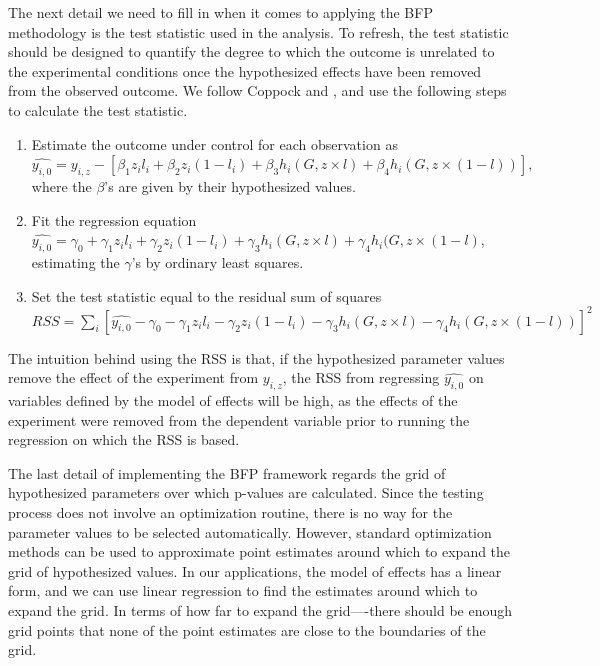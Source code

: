 \documentclass[12pt]{article}
\begin{document}
The next detail we need to fill in when it comes to applying the BFP methodology is the test statistic used in the analysis. To refresh, the test statistic should be designed to quantify the degree to which the outcome is unrelated to the experimental conditions once the hypothesized effects have been removed from the observed outcome. We follow Coppock and \citet{bowers2016research}, and use the following steps to calculate the test statistic.
\begin{enumerate}
\item Estimate the outcome under control for each observation as \\ $\hat{y_{i,0} } = y_{i,z} - \left[ \beta_1z_il_i+\beta_2z_i(1-l_i)+\beta_3h_i(G,z\times l)+\beta_4h_i(G,z\times (1-l)) \right],$ where the $\beta$'s are given by their hypothesized values.
\item Fit the regression equation  \\ $ \hat{y_{i,0} } = \gamma_0 + \gamma_1z_il_i+\gamma_2z_i(1-l_i)+\gamma_3h_i(G,z\times l)+\gamma_4h_i(G,z\times (1-l)$, estimating the $\gamma$'s by ordinary least squares. 
\item Set the test statistic equal to the residual sum of squares \\ $ RSS =  \sum_i \left[ \hat{y_{i,0} }-  \gamma_0 - \gamma_1z_il_i-\gamma_2z_i(1-l_i)-\gamma_3h_i(G,z\times l)-\gamma_4h_i(G,z\times (1-l) ) \right]^2$
\end{enumerate}
The intuition behind using the RSS is that, if the hypothesized parameter values remove the effect of the experiment from $y_{i,z}$, the RSS from regressing $\hat{y_{i,0} } $ on variables defined by the model of effects will be high, as the effects of the experiment were removed from the dependent variable prior to running the regression on which the RSS is based. 

The last detail of implementing the BFP framework regards the grid of hypothesized parameters over which p-values are calculated. Since the testing process does not involve an optimization routine, there is no way for the parameter values to be selected automatically. However, standard optimization methods can be used to approximate point estimates around which to expand the grid of hypothesized values. In our applications, the model of effects has a linear form, and we can use linear regression to find the estimates around which to expand the grid. In terms of how far to expand the grid----there should be enough grid points that none of the point estimates are close to the boundaries of the grid.
\end{document}
